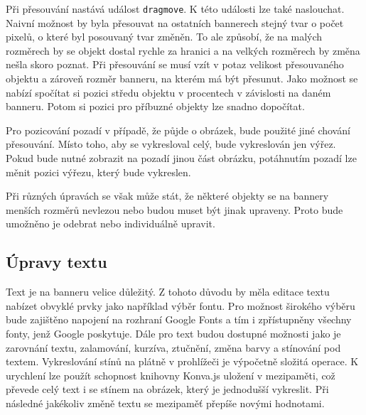         Při přesouvání nastává událost \texttt{dragmove}. K této události lze také naslouchat. Naivní možnost by byla přesouvat na ostatních bannerech stejný tvar o počet pixelů,
        o které byl posouvaný tvar změněn. To ale způsobí, že na malých rozměrech by se objekt dostal rychle za hranici a na velkých rozměrech by
        změna nešla skoro poznat. Při přesouvání se musí vzít v potaz velikost přesouvaného objektu a zároveň rozměr banneru, na kterém má být přesunut.
        Jako možnost se nabízí spočítat si pozici středu objektu v procentech v závislosti na daném banneru.
        Potom si pozici pro příbuzné objekty lze snadno dopočítat.

        Pro pozicování pozadí v případě, že půjde o obrázek, bude použité jiné chování přesouvání. Místo toho, aby se vykresloval celý, bude vykreslován jen výřez.
        Pokud bude nutné zobrazit na pozadí jinou část obrázku, potáhnutím pozadí lze měnit pozici výřezu, který bude vykreslen.

        Při různých úpravách se však může stát, že některé objekty se na bannery menších rozměrů nevlezou nebo budou muset být jinak upraveny.
        Proto bude umožněno je odebrat nebo individuálně upravit.

        \subsection{Úpravy textu}
        Text je na banneru velice důležitý. Z tohoto důvodu by měla editace textu nabízet obvyklé prvky jako například výběr fontu.
        Pro možnost širokého výběru bude zajištěno napojení na rozhraní Google Fonts a tím i zpřístupněny všechny fonty, jenž Google poskytuje.
        Dále pro text budou dostupné možnosti jako je zarovnání textu, zalamování, kurzíva, ztučnění, změna barvy a stínování pod textem.
        Vykreslování stínů na plátně v prohlížeči je výpočetně složitá operace. K urychlení lze použít schopnost knihovny Konva.js uložení v mezipaměti,
        což převede celý text i se stínem na obrázek,
        který je jednodušší vykreslit. Při následné jakékoliv změně textu se mezipaměť přepíše novými hodnotami.

